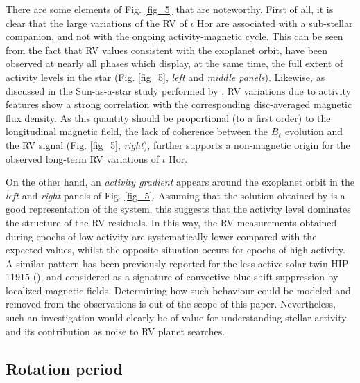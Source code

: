 \documentclass[a4paper,fleqn,usenatbib]{mnras}
\begin{document}
There are some elements of Fig. \ref{fig_5} that are noteworthy. First of all, it is clear that the large variations of the RV of $\iota$ Hor are associated with a sub-stellar companion, and not with the ongoing activity-magnetic cycle. This can be seen from the fact that RV values consistent with the exoplanet orbit, have been observed at nearly all phases which display, at the same time, the full extent of activity levels in the star (Fig. \ref{fig_5}, \textit{left} and \textit{middle panels}). Likewise, as discussed in the Sun-as-a-star study performed by , RV variations due to activity features show a strong correlation with the corresponding disc-averaged magnetic flux density. As this quantity should be proportional (to a first order) to the longitudinal magnetic field, the lack of coherence between the $B_{\ell}$ evolution and the RV signal (Fig. \ref{fig_5}, \textit{right}), further supports a non-magnetic origin for the observed long-term RV variations of $\iota$ Hor. 

On the other hand, an \textit{activity gradient} appears around the exoplanet orbit in the \textit{left} and \textit{right} panels of Fig. \ref{fig_5}. Assuming that the solution obtained by  is a good representation of the system, this suggests that the activity level dominates the structure of the RV residuals. In this way, the RV measurements obtained during epochs of low activity are systematically lower compared with the expected values, whilst the opposite situation occurs for epochs of high activity. A similar pattern has been previously reported for the less active solar twin HIP 11915 (), and considered as a signature of convective blue-shift suppression by localized magnetic fields. Determining how such behaviour could be modeled and removed from the observations is out of the scope of this paper. Nevertheless, such an investigation would clearly be of value for understanding stellar activity and its contribution as noise to RV planet searches. 


\subsection{Rotation period}\label{sec_rotation}
\end{document}
